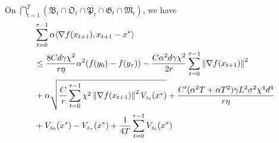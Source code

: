 \begin{lemma}
    \label{lem:regret-bound}
    On $\bigcap_{t=1}^{T} (\mathfrak B_t \cap \mathfrak O_t \cap \mathfrak P_t \cap \mathfrak G_t \cap \mathfrak M_t)$, we have
    \begin{align*}
        &\sum_{t=0}^{\tau-1} \alpha \langle \nabla f(x_{t+1}), x_{t+1}-x^* \rangle
        \\&\leq \frac{8Cd \gamma \chi^2}{r \eta} \alpha^2(f(y_0) - f(y_\tau)) -\frac{C\alpha^2d\gamma \chi^2}{2r} \sum_{t=0}^{\tau-1} \left\lVert \nabla f(x_{t+1}) \right\rVert^2  \\
        &+\alpha \sqrt{ \frac C r \sum_{t=0}^{\tau-1} \chi^2 \left\lVert \nabla f(x_{t+1}) \right\rVert^2 V_{z_t}(x^*)} + \frac{C'(\alpha^2 T+\alpha T^2) \gamma L^2 \sigma^2 \chi^4 d^4}{r\eta}  \\
        &+ V_{z_0}(x^*) - V_{z_\tau}(x^*) + \frac{1}{4T} \sum_{t=0}^{\tau-1} V_{z_t}(x^*)
    \end{align*}
\end{lemma}
